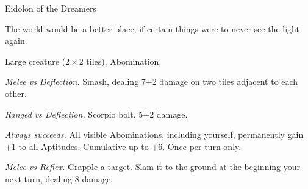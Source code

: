 \begin{monsterboxbg}{Eidolon of the Dreamers}

    The world would be a better place, if certain things were to never see the light again.
    
    \rpghline
    \stats[
        STR = \stat{16}, 
        DEX = \stat{14},
        CON = \stat{22},
        INT = \stat{10},
        WIS = \stat{10},
        CHA = \stat{12},
    ]
    \rpghline

    \basics[
    armorclass = 0,
    hitpoints  = 200,
    focus      = 12,
    defenses   = {Deflection 1, Reflex 1, Fortitude 9, Will 2}
    ]
    \rpghline

    \details[%
    skills = {Athletics 2},
    accuracies = {Melee 4, Ranged 0},
    challenge = Boss,
    ]
    \rpghline%
    \begin{rpg-monsteraction}
        Large creature ($2 \times 2$ tiles). Abomination.
    \end{rpg-monsteraction}

    

    \begin{rpg-monsteraction}
        \textit{Melee vs Deflection.} Smash, dealing 7+2 damage on two tiles adjacent to each other.
    \end{rpg-monsteraction}

    \begin{rpg-monsteraction}
        \textit{Ranged vs Deflection.} Scorpio bolt. 5+2 damage.
    \end{rpg-monsteraction}

    \begin{rpg-monsteraction}
    \end{rpg-monsteraction}

    \begin{rpg-monsteraction}
        \textit{Always succeeds.} All visible Abominations, including yourself, permanently gain +1 to all Aptitudes. Cumulative up to +6. Once per turn only.
    \end{rpg-monsteraction}

    \begin{rpg-monsteraction}
        \textit{Melee vs Reflex.} Grapple a target. Slam it to the ground at the beginning your next turn, dealing 8 damage.
    \end{rpg-monsteraction}


\end{monsterboxbg}
